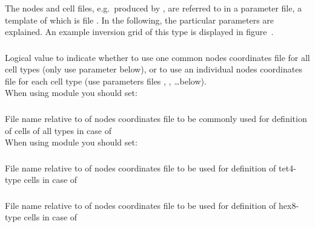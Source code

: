 The nodes and cell files, e.g.\ produced by , are referred to in a parameter file, a template 
of which is file . In the following, the particular 
parameters are explained. An example inversion grid of this type is displayed in 
figure~.

\subsubsection{}
Logical value to indicate whether to use one common nodes coordinates file for 
all cell types (only use parameter  below), or to use an individual 
nodes coordinates file for each cell type (use parameters files , 
, \dots below).\\
When using module  you should set:\\
\subsubsection{}
File name relative to  of nodes coordinates file to be commonly used
for definition of cells of all types in case of \\
When using module  you should set:\\
\subsubsection{}
File name relative to  of nodes coordinates file to be used
for definition of tet4-type cells in case of \\
\subsubsection{}
File name relative to  of nodes coordinates file to be used
for definition of hex8-type cells in case of \\
